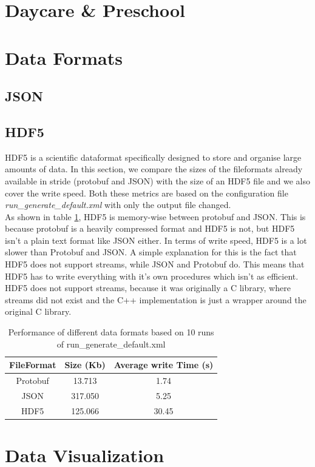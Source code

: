 \documentclass[runningheads]{llncs}
\begin{document}
	\section{Daycare \& Preschool}
	\section{Data Formats}
	\subsection{JSON}
	\subsection{HDF5}
	HDF5 is a scientific dataformat specifically designed to store and organise large amounts of data. In this section, we compare the sizes of the fileformats already available in stride (protobuf and JSON) with the size of an HDF5 file and we also cover the write speed. Both these metrics are based on the configuration file \textit{run\_generate\_default.xml} with only the output file changed.
	\\
	As shown in table \ref{table:1}, HDF5 is memory-wise between protobuf and JSON. This is because protobuf is a heavily compressed format and HDF5 is not, but HDF5 isn't a plain text format like JSON either. In terms of write speed, HDF5 is a lot slower than Protobuf and JSON. A simple explanation for this is the fact that HDF5 does not support streams, while JSON and Protobuf do. This means that HDF5 has to write everything with it's own procedures which isn't as efficient. HDF5 does not support streams, because it was originally a C library, where streams did not exist and the C++ implementation is just a wrapper around the original C library.
	\begin{table}
		\centering
		\begin{tabular}{|c|c|c|}
			\hline
			\textbf{FileFormat} & \textbf{Size (Kb)}  & \textbf{Average write Time (s)}\\ \hline
			Protobuf & 13.713 & 1.74\\ \hline
			JSON & 317.050 & 5.25\\ \hline
			HDF5 & 125.066 & 30.45 \\ \hline
		\end{tabular}
		\caption{Performance of different data formats based on 10 runs of run\_generate\_default.xml}
		\label{table:1}
	\end{table}
	\section{Data Visualization}
\end{document}
